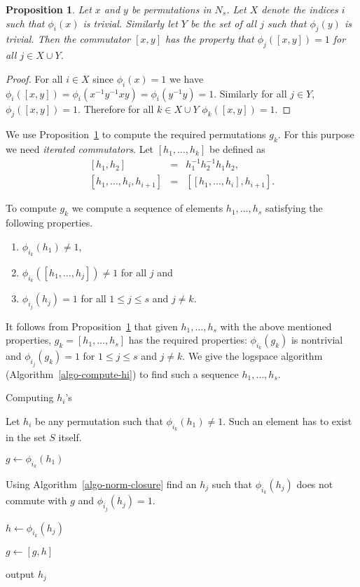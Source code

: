 \documentclass[11pt]{madras}%
\newtheorem{proposition}[theorem]{Proposition}
\theoremstyle{remark}
\newcommand{\commu}[1]{{\ensuremath{\left\lbrack #1 \right\rbrack}}}
\begin{document}
\begin{proposition}\label{prop-commutator}
  Let $x$ and $y$ be permutations in $N_s$. Let $X$ denote the
  indices $i$ such that $\phi_i(x)$ is trivial. Similarly let $Y$ be
  the set of all $j$ such that $\phi_j(y)$ is trivial.  Then the
  commutator $[x,y]$ has the property that $\phi_{j}([x,y]) = 1$ for
  all $j \in X \cup Y$.
\end{proposition}
\begin{proof}
  For all $i \in X$ since $\phi_i(x) = 1$ we have $\phi_i([x,y]) =
  \phi_i(x^{-1}y^{-1} x y ) = \phi_i(y^{-1} y) = 1$. Similarly for all
  $j \in Y$, $\phi_j([x,y]) = 1$. Therefore for all $k \in X \cup Y$
  $\phi_{k}([x,y]) = 1$.
\end{proof}
    
We use Proposition~\ref{prop-commutator} to compute the required
permutations $g_k$. For this purpose we need \emph{iterated
  commutators}. Let $\commu{h_1,\ldots,h_k}$ be defined as
\begin{eqnarray*}
  \commu{h_1,h_2} &=& h_1^{-1}h_2^{-1}h_1h_2,\\
  \commu{h_1,\ldots,h_i,h_{i+1}} &=& \left[
    \commu{h_1,\ldots,h_i},h_{i+1}\right].
\end{eqnarray*}

To compute $g_k$ we compute a sequence of elements $h_1,\ldots,h_s$
satisfying the following properties.

\begin{enumerate}
\item $\phi_{i_k}(h_1) \neq 1$,
\item $\phi_{i_k}(\commu{h_1,\ldots,h_j}) \neq 1$ for all $j$ and
\item $\phi_{i_j}(h_j) = 1$ for all $1 \leq j \leq s $ and $j \neq
  k$.
\end{enumerate}
  
It follows {from} Proposition~\ref{prop-commutator} that given
$h_1,\ldots,h_s$ with the above mentioned properties, $g_k =
\commu{h_1,\ldots,h_s}$ has the required properties: $\phi_{i_k}(g_k)$
is nontrivial and $\phi_{i_j}(g_k) =1$ for $1 \leq j \leq s$ and $j
\neq k$.  We give the logspace algorithm
(Algorithm~\ref{algo-compute-hi}) to find such a sequence
$h_1,\ldots,h_s$.

\begin{algorithm}
  \caption{Computing $h_i$'s}\label{algo-compute-hi}
  
  Let $h_i$ be any permutation such that $\phi_{i_k}(h_1) \neq 1$.
  Such an element has to exist in the set $S$ itself.
  
  $g \leftarrow \phi_{i_k}(h_1)$
  
   {
    
    Using Algorithm~\ref{algo-norm-closure} find an $h_j$ such that
    $\phi_{i_k}(h_j)$ does not commute with $g$ and $\phi_{i_j}(h_j) =
    1$.

    $h \leftarrow \phi_{i_k}(h_j)$

    $g \leftarrow [g,h]$

    output $h_j$ 
      
  }
\end{algorithm}
\end{document}
